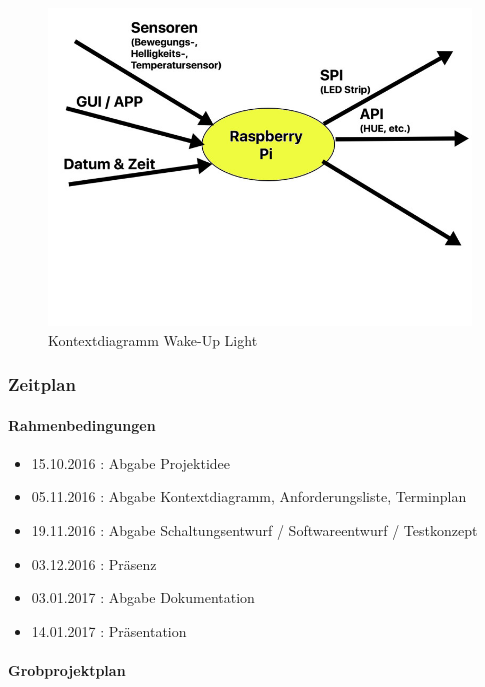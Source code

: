 \documentclass[]{article}
\providecommand{\tightlist}{%
  \setlength{\itemsep}{0pt}\setlength{\parskip}{0pt}}
\let\oldparagraph\paragraph
\renewcommand{\paragraph}[1]{\oldparagraph{#1}\mbox{}}
\begin{document}
\begin{figure}[H]
\centering
\includegraphics{./Kontextdiagramm.jpeg}
\caption{Kontextdiagramm Wake-Up Light}
\end{figure}

\subsubsection{Zeitplan}\label{zeitplan}

\paragraph{Rahmenbedingungen}\label{rahmenbedingungen}

\begin{itemize}
\tightlist
\item
  15.10.2016 : Abgabe Projektidee
\item
  05.11.2016 : Abgabe Kontextdiagramm, Anforderungsliste, Terminplan
\item
  19.11.2016 : Abgabe Schaltungsentwurf / Softwareentwurf / Testkonzept
\item
  03.12.2016 : Präsenz
\item
  03.01.2017 : Abgabe Dokumentation
\item
  14.01.2017 : Präsentation
\end{itemize}

\paragraph{Grobprojektplan}\label{grobprojektplan}
\end{document}
